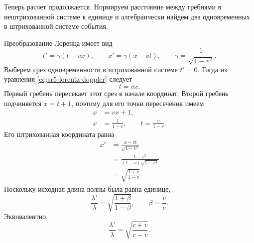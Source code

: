 \begin{classroomqa}
\end{classroomqa}

\begin{classroomqa}
\end{classroomqa}

Теперь расчет продолжается. Нормируем расстояние между гребнями в нештрихованной системе к единице и алгебраически найдем два одновременных в штрихованной системе события.

Преобразование Лоренца имеет вид \begin{equation}
t'=\gamma(t-vx),
\qquad
x'=\gamma(x-vt),
\qquad
\gamma=\frac{1}{\sqrt{1-v^2}}.
\label{eq:sr5-lorentz-doppler}
\end{equation} Выберем срез одновременности в штрихованной системе \(t'=0\). Тогда из уравнения \eqref{eq:sr5-lorentz-doppler} следует \begin{equation}
t=vx.
\label{eq:sr5-primed-simultaneity}
\end{equation} Первый гребень пересекает этот срез в начале координат. Второй гребень подчиняется \(x=t+1\), поэтому для его точки пересечения имеем \begin{align}
x&=vx+1,\\
x&=\frac{1}{1-v},
\qquad
t=\frac{v}{1-v}.
\end{align} Его штрихованная координата равна \begin{align}
x'
&=\frac{x-vt}{\sqrt{1-v^2}}\\
&=\frac{1-v^2}{(1-v)\sqrt{1-v^2}}\\
&=\sqrt{\frac{1+v}{1-v}}.
\end{align} Поскольку исходная длина волны была равна единице, \begin{equation}
\boxed{
\frac{\lambda'}{\lambda}
=
\sqrt{\frac{1+\beta}{1-\beta}}
},
\qquad
\beta=\frac{v}{c}.
\label{eq:sr5-doppler}
\end{equation} Эквивалентно, \begin{equation}
\frac{\lambda'}{\lambda}
=
\sqrt{\frac{c+v}{c-v}}.
\end{equation}

